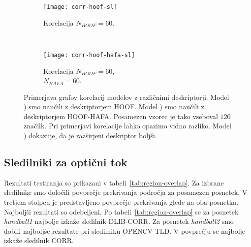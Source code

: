 \begin{figure}[!htbp]
	\centering
	\begin{subfigure}[t]{0.45\columnwidth}
		\texttt{[image: corr-hoof-sl]}
		\caption{Korelacija $N_{HOOF}=60$.}
		\label{fig:izbira-hoof}
	\end{subfigure}
	~
	\begin{subfigure}[t]{0.45\columnwidth}
		\texttt{[image: corr-hoof-hafa-sl]}
		\caption{Korelacija $N_{HOOF}=60$,\\$N_{HAFA}=60$.}
		\label{fig:izbira-hoofhafa}
	\end{subfigure}
	\caption[Primerjava modelov z deskriptorji HOOF in HOOF-HAFA]{Primerjava grafov korelacij modelov z različnimi deskriptorji. Model ) smo naučili z deskriptorjem HOOF. Model ) smo naučili z deskriptorjem HOOF-HAFA. Posamezen vzorec je tako vseboval $120$ značilk. Pri primerjavi korelacije lahko opazimo vidno razliko. Model ) dokazuje, da je razširjeni deskriptor boljši.}
	\label{fig:izbira}
\end{figure}




















\subsection{Sledilniki za optični tok} \label{sec:rezultati-sledilnikov-za-opticni-tok}


Rezultati testiranja so prikazani v tabeli~\ref{tab:region-overlap}. Za izbrane sledilnike smo določili povprečje prekrivanja področja za posamezen posnetek. V tretjem stolpcu je predstavljeno povprečje prekrivanja glede na oba posnetka. Najboljši rezultati so odebeljeni. Po tabeli~\ref{tab:region-overlap} se za posnetek \textit{handball1} najbolje izkaže sledilnik DLIB-CORR. Za posnetek \textit{handball2} smo dobili najboljše rezultate pri sledilniku OPENCV-TLD. V povprečju se najbolje izkaže sledilnik CORR.





